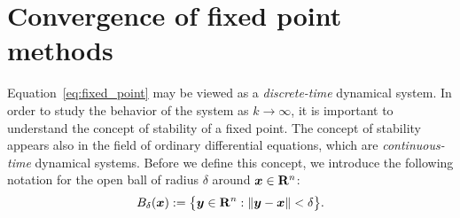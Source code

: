 \section{Convergence of fixed point methods}
Equation~\eqref{eq:fixed_point} may be viewed as a \emph{discrete-time} dynamical system.
In order to study the behavior of the system as $k \to \infty$,
it is important to understand the concept of stability of a fixed point.
The concept of stability appears also in the field of ordinary differential equations,
which are \emph{continuous-time} dynamical systems.
Before we define this concept,
we introduce the following notation
for the open ball of radius $\delta$ around $\mathbf{\boldsymbol{x}} \in \mathbf R^n$:
\[
    B_{\delta} (\mathbf{\boldsymbol{x}}) := \bigl\{ \mathbf{\boldsymbol{y}} \in \mathbf R^n : \lVert\mathbf{\boldsymbol{y}} - \mathbf{\boldsymbol{x}}\rVert < \delta \bigr\}.
\]
\vspace{-.7cm}
